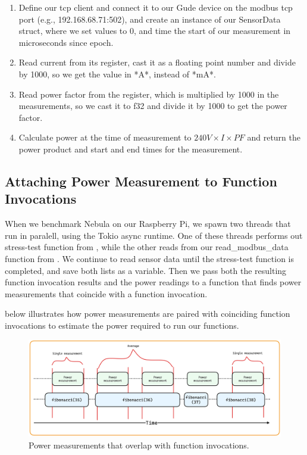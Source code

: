 \documentclass[
  table]{report}
\begin{document}
\renewcommand{\theenumi}{5.\arabic{enumi}}
\begin{enumerate}
  \item Define our tcp client and connect it to our Gude device on the modbus tcp port (e.g., 192.168.68.71:502), and create an instance of our SensorData struct, where we set values to 0, and time the start of our measurement in microseconds since epoch.
  \item Read current from its register, cast it as a floating point number and divide by 1000, so we get the value in *A*, instead of *mA*.
  \item Read power factor from the register, which is multiplied by 1000 in the measurements, so we cast it to f32 and divide it by 1000 to get the power factor.
  \item Calculate power at the time of measurement to \(240V \times I \times PF\) and return the power product and start and end times for the measurement.
\end{enumerate}

\subsection{Attaching Power Measurement to Function Invocations}

When we benchmark Nebula on our Raspberry Pi, we spawn two threads that
run in paralell, using the Tokio async runtime. One of these threads
performs out stress-test function from , while
the other reads from our read\_modbus\_data function from
. We continue to read sensor data until the
stress-test function is completed, and save both lists as a variable.
Then we pass both the resulting function invocation results and the
power readings to a function that finds power measurements that coincide
with a function invocation.

 below illustrates how power
measurements are paired with coinciding function invocations to estimate
the power required to run our functions.

\begin{figure}[H]
\centering
  \includegraphics{assets/6-power_measurements}
  \caption{Power measurements that overlap with function invocations.}
  \label{fig:power_measurement_timeline}
\end{figure}
\end{document}
